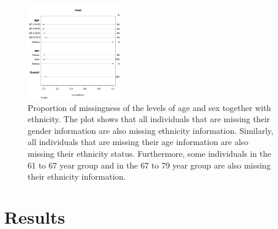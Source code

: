 \documentclass[paper=a4, fontsize=11pt]{scrartcl} %
\numberwithin{equation}{section} %
\numberwithin{figure}{section} %
\numberwithin{table}{section} %
\begin{document}
\begin{figure}
  \begin{center}
    \includegraphics[width=0.38\textwidth]{./rcode/plots/na_ethnic_regressed}
  \end{center}
  \caption{Proportion of missingness of the levels of age and sex together with ethnicity. The plot shows that all individuals that are missing their gender information are also missing ethnicity information. Similarly, all individuals that are missing their age information are also missing their ethnicity status. Furthermore, some individuals in the 61 to 67 year group and in the 67 to 79 year group are also missing their ethnicity information.}
  \label{fig:na_ethnic_regressed}
\end{figure}

\section{Results}
\end{document}

